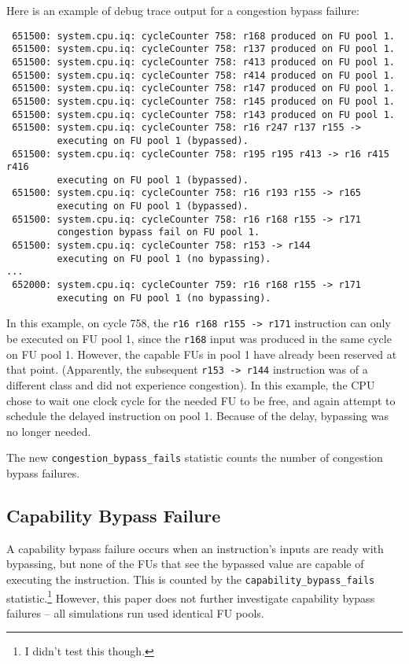 \documentclass[11pt]{article}
\begin{document}
Here is an example of debug trace output for a congestion bypass
failure:
\begin{verbatim}
 651500: system.cpu.iq: cycleCounter 758: r168 produced on FU pool 1.
 651500: system.cpu.iq: cycleCounter 758: r137 produced on FU pool 1.
 651500: system.cpu.iq: cycleCounter 758: r413 produced on FU pool 1.
 651500: system.cpu.iq: cycleCounter 758: r414 produced on FU pool 1.
 651500: system.cpu.iq: cycleCounter 758: r147 produced on FU pool 1.
 651500: system.cpu.iq: cycleCounter 758: r145 produced on FU pool 1.
 651500: system.cpu.iq: cycleCounter 758: r143 produced on FU pool 1.
 651500: system.cpu.iq: cycleCounter 758: r16 r247 r137 r155 ->
         executing on FU pool 1 (bypassed).
 651500: system.cpu.iq: cycleCounter 758: r195 r195 r413 -> r16 r415 r416
         executing on FU pool 1 (bypassed).
 651500: system.cpu.iq: cycleCounter 758: r16 r193 r155 -> r165
         executing on FU pool 1 (bypassed).
 651500: system.cpu.iq: cycleCounter 758: r16 r168 r155 -> r171
         congestion bypass fail on FU pool 1.
 651500: system.cpu.iq: cycleCounter 758: r153 -> r144
         executing on FU pool 1 (no bypassing).
...
 652000: system.cpu.iq: cycleCounter 759: r16 r168 r155 -> r171
         executing on FU pool 1 (no bypassing).
\end{verbatim}
In this example, on cycle 758, the \texttt{r16 r168 r155 -> r171}
instruction can only be executed on FU pool 1, since the \texttt{r168}
input was produced in the same cycle on FU pool 1. However, the
capable FUs in pool 1 have already been reserved at that
point. (Apparently, the subsequent \texttt{r153 -> r144} instruction
was of a different class and did not experience congestion). In this
example, the CPU chose to wait one clock cycle for the needed FU to be
free, and again attempt to schedule the delayed instruction on pool
1. Because of the delay, bypassing was no longer needed.

The new \texttt{congestion\_bypass\_fails} statistic counts the number
of congestion bypass failures.

\subsection{Capability Bypass Failure}

A capability bypass failure occurs when an instruction's inputs are
ready with bypassing, but none of the FUs that see the bypassed value
are capable of executing the instruction. This is counted by the
\texttt{capability\_bypass\_fails} statistic.\footnote{I didn't test
  this though.} However, this paper does not further investigate
capability bypass failures -- all simulations run used identical FU
pools.
\end{document}
